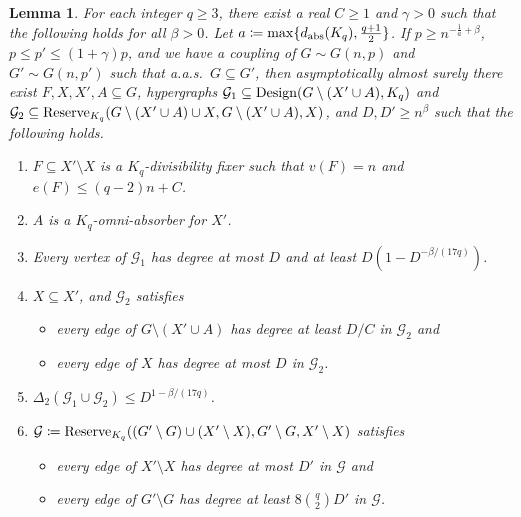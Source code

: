 \documentclass[11pt]{article}
\numberwithin{equation}{section}
\newcounter{i}
\theoremstyle{plain}
\newtheorem{lem}[thm]{Lemma}
\theoremstyle{plain} %
\theoremstyle{definition}
\newcommand{\cG}{\mathcal{G}}
\newcommand{\aas}{a.a.s.\ }
\begin{document}
\begin{lem}\label{lem:what-appears-in-Gnp}
  For each integer $q \geq 3$, there exist a real $C \geq 1$ and $\gamma > 0$ such that the following holds for all $\beta > 0$. Let $a \coloneqq \max\{d_{\rm abs}(K_q), \frac{q + 1}{2}\}$.  
  If $p \geq n^{-\frac{1}{a} + \beta}$, $p \leq p' \leq (1 + \gamma)p$, and we have a coupling of $G \sim G(n,p)$ and $G' \sim G(n,p')$ such that \aas $G \subseteq G'$, then asymptotically almost surely there exist 
  $F, X, X', A \subseteq G$, 
  hypergraphs $\cG_1 \subseteq {\rm Design}(G \setminus (X' \cup A), K_q)$ and
  $\cG_2 \subseteq {\rm Reserve}_{K_q}(G \setminus (X' \cup A) \cup X, G \setminus (X' \cup A), X)$, and 
  $D,D' \geq n^\beta$ such that the following holds.
    \begin{enumerate}[label=(\ref*{lem:what-appears-in-Gnp}.\arabic*), left=0pt]
    \item\label{what-appears-in-Gnp:div-fixer} $F \subseteq X' \setminus X$ is a $K_q$-divisibility fixer such that $v(F) = n$ and $e(F) \leq (q - 2)n + C$. \label{what-appears-in-Gnp:first}
    \item\label{what-appears-in-Gnp:omni-absorber} $A$ is a $K_q$-omni-absorber for $X'$. 
    \item\label{what-appears-in-Gnp:boosted-design-hypergraph} Every vertex of $\cG_1$ has degree at most $D$ and at least $D\left(1 - D^{-\beta/(17q)}\right)$.
    \item\label{what-appears-in-Gnp:reserves} $X\subseteq X'$, and $\cG_2$ satisfies
      \begin{itemize}
        \item every edge of $G \setminus (X' \cup A)$ has degree at least $D / C$ in $\cG_2$ and
        \item every edge of $X$ has degree at most $D$ in $\cG_2$.
        \end{itemize}
    \item\label{what-appears-in-Gnp:codegrees} $\Delta_2(\cG_1 \cup \cG_2) \leq D^{1 - \beta/(17q)}$.
    \item\label{what-appears-in-Gnp:reserves2} $\cG \coloneqq {\rm Reserve}_{K_q}((G' \setminus G) \cup (X' \setminus X), G' \setminus G, X' \setminus X)$ satisfies
    \begin{itemize}
        \item every edge of $X'\setminus X$ has degree at most $D'$ in $\cG$ and 
        \item every edge of $G' \setminus G$ has degree at least $8\binom{q}{2}D'$ in $\cG$.
    \end{itemize}
    \label{what-appears-in-Gnp:last}
\end{enumerate}
\end{lem}
\end{document}
